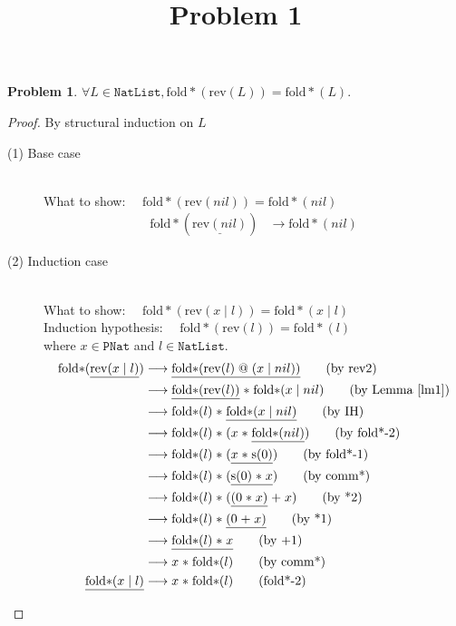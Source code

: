 \documentclass[12pt, a4paper]{article}
\title{Problem 1}
\date{\vspace{-5ex}}
\newtheorem{problem}{Problem}
\newcommand{\rel}[1]{\mathrel{#1}}
\newcommand{\rmx}[1]{\mathrm{#1}}
\newcommand{\larrow}{\longrightarrow}
\newcommand{\under}{\underline}
\begin{document}
\maketitle

\begin{problem}
$\forall L \in \mathtt{NatList}, \rmx{fold*}(\rmx{rev}(L)) = \rmx{fold*}(L).$
\end{problem}
\begin{proof}
By structural induction on $L$

\begin{description}

\item[(1) Base case]~\\
\noindent
What to show: $\quad\rmx{fold*}(\rmx{rev}(nil)) = \rmx{fold*}(nil)$
\begin{align*}
\rmx{fold*}(\under{\rmx{rev}(nil)}) &\larrow \rmx{fold*}(nil) \tag{by rev1}
\end{align*}

\item[(2) Induction case]~\\
What to show: $\quad\rmx{fold*}(\rmx{rev}(x \rel{|} l)) = \rmx{fold*}(x \rel{|} l)$\\
Induction hypothesis: $\quad\rmx{fold*}(\rmx{rev}(l)) = \rmx{fold*}(l)$\\
where $x \in \mathtt{PNat}$ and $l \in \mathtt{NatList}.$
\begin{align*}
\rmx{fold*}(\under{\rmx{rev}(x \rel{|} l)}) 
	&\larrow \under{\rmx{fold*}(\rmx{rev}(l)\rel{@}(x \rel{|} nil))} \tag{by rev2} \\
	&\larrow \under{\rmx{fold*}(\rmx{rev}(l))} \rel{*} \rmx{fold*}(x \rel{|} nil) \tag{by Lemma~\ref{lm1}} \\
	&\larrow \rmx{fold*}(l) \rel{*} \under{\rmx{fold*}(x \rel{|} nil)} \tag{by IH} \\
	&\larrow \rmx{fold*}(l) \rel{*} (x \rel{*} \under{\rmx{fold*}(nil)}) \tag{by fold*-2} \\
	&\larrow \rmx{fold*}(l) \rel{*} (\under{x \rel{*} \rmx{s}(0)}) \tag{by fold*-1} \\
	&\larrow \rmx{fold*}(l) \rel{*} (\under{\rmx{s}(0) \rel{*} x}) \tag{by comm*} \\
	&\larrow \rmx{fold*}(l) \rel{*} (\under{(0 \rel{*} x)} \rel{+} x) \tag{by *2} \\
	&\larrow \rmx{fold*}(l) \rel{*} \under{(0 \rel{+} x)} \tag{by *1} \\
	&\larrow \under{\rmx{fold*}(l) \rel{*} x} \tag{by +1} \\
	&\larrow x \rel{*} \rmx{fold*}(l) \tag{by comm*} \\
\under{\rmx{fold*}(x \rel{|} l)} 
	&\larrow x \rel{*} \rmx{fold*}(l) \tag{fold*-2}
\end{align*}

\end{description}
\end{proof}
\end{document}
